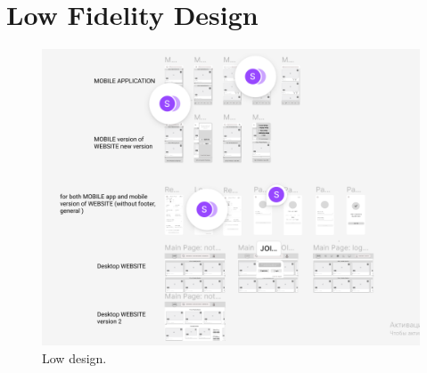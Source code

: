 \section{Low Fidelity Design}\label{lowdesign}
\begin{figure}[H]\label{fig:lowdesign}
  \centering
  \includegraphics[width=0.8\linewidth]{figures/wireframe.png}
  \caption{Low design.}
\end{figure}